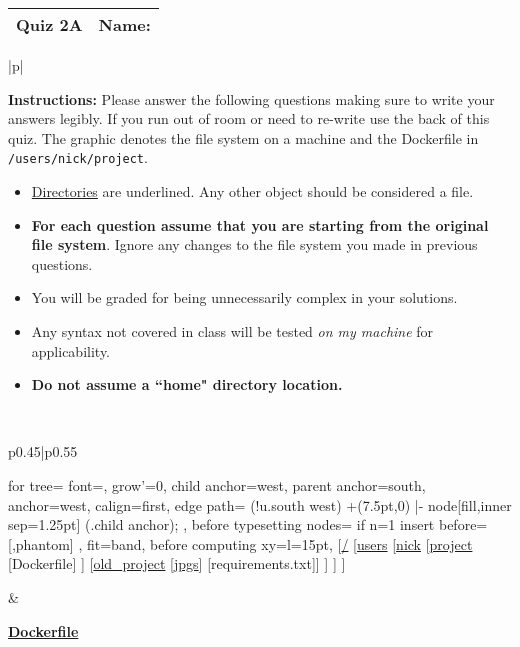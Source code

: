 \documentclass[11pt]{article}
\begin{document}
\begin{tabularx}{\textwidth}{l|X}
\textbf{Quiz 2A} &   \textbf{Name: } \\
\hline
\end{tabularx}


\begin{table}[h]
\centering
{} %
\begin{tabular}{|p{\textwidth}|}
\hline
\begin{minipage}[t]{\textwidth}
\vspace{0pt}  %
\noindent \textbf{Instructions:} Please answer the following questions making sure to write your answers legibly. If you run out of room or need to re-write use the back of this quiz.  The graphic denotes the file system on a machine and the Dockerfile in \texttt{/users/nick/project}.
\begin{itemize}
    \item \underline{Directories} are underlined. Any other object should be considered a file.
    \item \textbf{For each question assume that you are starting from the original file system}. Ignore any changes to the file system you made in previous questions.
    \item You will be graded for being unnecessarily complex in your solutions. 
    \item Any syntax not covered in class will be tested \emph{on my machine} for applicability.

    \item \textbf{Do not assume a ``home" directory location.}
\end{itemize}


\end{minipage} \\
\hline
\begin{tabular}{p{0.45\textwidth}|p{0.55\textwidth}}
\begin{minipage}[t]{\linewidth}
\vspace{0pt}  %
\begin{forest}
  for tree={
    font=\ttfamily,
    grow'=0,
    child anchor=west,
    parent anchor=south,
    anchor=west,
    calign=first,
    edge path={
      \noexpand{}
      (!u.south west) +(7.5pt,0) |- node[fill,inner sep=1.25pt] {} (.child anchor);
    },
    before typesetting nodes={
      if n=1
        {insert before={[,phantom]}}
        {}
    },
    fit=band,
    before computing xy={l=15pt},
  }
[\underline{/}
  [\underline{users}
    [\underline{nick}
      [\underline{project}
        [Dockerfile]
      ]
      [\underline{old\_project}
        [\underline{jpgs}]
        [requirements.txt]]
    ]
  ]
]
\end{forest}
\end{minipage}
&
\begin{minipage}[t]{\linewidth}
\vspace{0pt}  %
\underline{\textbf{Dockerfile}}


\end{minipage}
\end{tabular}
\end{tabular}
\end{table}
\end{document}
